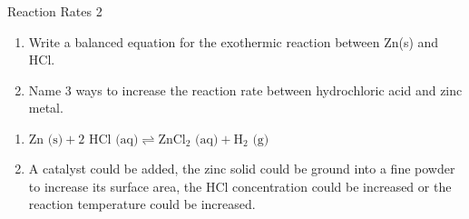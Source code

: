 \begin{wex}{Reaction Rates 2}{
\begin{enumerate}
  \item Write a balanced equation for the exothermic reaction between
  Zn(s) and HCl. 
  \item Name 3 ways to increase the reaction rate between hydrochloric
  acid and zinc metal.     
\end{enumerate}}  
   {
   \begin{enumerate}
     \item $\text{Zn (s)} + 2\text{ HCl (aq)} \rightleftharpoons  \text{ZnCl}_{2}\text{ (aq)}+ \text{H}_{2}\text{ (g)}$
     \item A catalyst could be added, the zinc solid could be ground
     into a fine powder to increase its surface area, the HCl
     concentration could be increased or the reaction temperature
     could be increased.        
   \end{enumerate}}  
\end{wex}  

